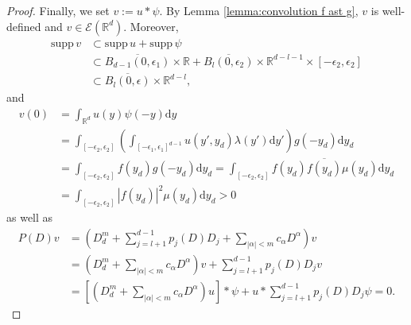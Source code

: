 \documentclass[10pt,a4paper]{amsart}
\newcommand{\R}{\mathbb{R}}
\newcommand{\supp}{\mbox{supp}\,}
\begin{document}
\begin{proof}
	Finally, we set $v:=u\ast\psi$. By Lemma \ref{lemma:convolution f ast g}, $v$ is well-defined and $v\in \mathscr{E}(\R^d)$. Moreover,
    \begin{align*}
		\supp{v}&\subset\supp u+\supp\psi\\
		&\subset\overline{B_{d-1}(0,\epsilon_1)}\times\R
		+\overline{B_{l}(0,\epsilon_2)}\times\R^{d-l-1}\times\left[-\epsilon_2,\epsilon_2\right]\\
		&\subset\overline{B_{l}(0,\epsilon)}\times\R^{d-l},
	\end{align*}
	and
	\begin{align*}
		v(0)&=\int_{\R^d}u(y)\psi(-y)\mathrm{d}y\\
		&=\int_{[-\epsilon_2,\epsilon_2]}\left(\int_{[-\epsilon_1,\epsilon_1]^{d-1}}u(y',y_d)\lambda(y')\mathrm{d}y'\right)g(-y_d)\mathrm{d}y_d\\
		&=\int_{[-\epsilon_2,\epsilon_2]}f(y_d)g(-y_d)\mathrm{d}y_d=\int_{[-\epsilon_2,\epsilon_2]}f(y_d)\overline{f(y_d)}\mu(y_d)\mathrm{d}y_d\\
		&=\int_{[-\epsilon_2,\epsilon_2]}|f(y_d)|^2\mu(y_d)\mathrm{d}y_d>0
	\end{align*}
	as well as
	\begin{align*}
		P(D)v&=\left(D_d^m+\sum_{j=l+1}^{d-1}p_j(D)D_j+\sum_{|\alpha|<m}c_\alpha D^\alpha\right)v\\
		&=\left(D_d^m+\sum_{|\alpha|<m}c_\alpha D^\alpha\right)v
		+\sum_{j=l+1}^{d-1}p_j(D)D_jv\\
		&=\left[\left(D_d^m+\sum_{|\alpha|<m}c_\alpha D^\alpha\right)u\right]\ast\psi+u\ast\sum_{j=l+1}^{d-1}p_j(D)D_j\psi=0.
	\end{align*}
	

\end{proof}
\end{document}
